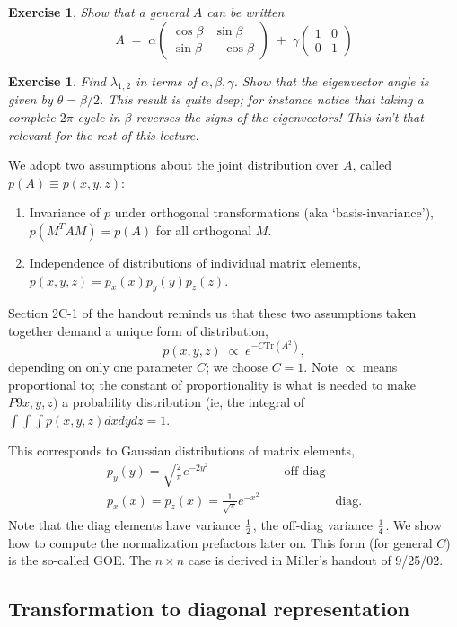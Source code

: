 \documentclass[12pt,letterpaper]{report}
\newcommand\be{\begin{equation}}
\newcommand\ee{\end{equation}}
\newcommand\bea{\begin{eqnarray}}
\newcommand\eea{\end{eqnarray}}
\newcommand\ben{\begin{enumerate}}
\newcommand\een{\end{enumerate}}
\newtheorem{exe}[thm]{Exercise}
\newcommand{\sym}[3]{\ensuremath{\left(\begin{array}{ll}#1 &#2 \\ #2 &#3%
\end{array}\right)}}
\newcommand{\half}{\mbox{\small $\frac{1}{2}$}}
\newcommand{\sfrac}[1]{\mbox{\small $\frac{1}{#1}$}}
\begin{document}
\begin{exe}
Show that a general $A$ can be written \be A \; = \; \alpha
\sym{\cos \beta}{\sin \beta}{-\cos \beta} \; + \;
\gamma\sym{1}{0}{1} \ee
\end{exe}

\begin{exe}
Find $\lambda_{1,2}$ in terms of $\alpha, \beta, \gamma$. Show
that the eigenvector angle is given by $\theta = \beta/2$. This
result is quite deep; for instance notice that taking a complete
$2\pi$ cycle in $\beta$ reverses the signs of the eigenvectors!
This isn't that relevant for the rest of this lecture.
\end{exe}


We adopt two assumptions about the joint distribution over $A$,
called $p(A) \equiv p(x,y,z)$: \ben
\item Invariance of $p$ under orthogonal transformations
(aka `basis-invariance'), $p(M^T A M) = p(A)$ for all orthogonal
$M$.
\item Independence of distributions of individual
matrix elements, $p(x,y,z) = p_x(x) p_y(y)p_z(z)$. \een Section
2C-1 of the handout reminds us that these two assumptions taken
together demand a unique form of distribution, \be
    p(x,y,z) \; \propto \; e^{-C\text{Tr}(A^2)},
\ee depending on only one parameter $C$; we choose $C=1$. Note
$\propto$ means proportional to; the constant of proportionality
is what is needed to make $P9x,y,z)$ a probability distribution
(ie, the integral of $\int \int \int p(x,y,z) dx dy dz = 1$.


This corresponds to Gaussian distributions of matrix elements,
\bea
    p_y(y) = \sqrt{\frac{2}{\pi}} e^{-2 y^2} \hspace{1in} \mbox{off-diag}
\nonumber \\
    p_x(x) = p_z(x) = \frac{1}{\sqrt{\pi}} e^{-x^2} \hspace{1in}
\mbox{diag.} \eea Note that the diag elements have variance
$\half$, the off-diag variance $\sfrac{4}$. We show how to compute
the normalization prefactors later on. This form (for general $C$)
is the so-called GOE. The $n\times n$ case is derived in Miller's
handout of 9/25/02.




\subsection{Transformation to diagonal representation}
\end{document}
